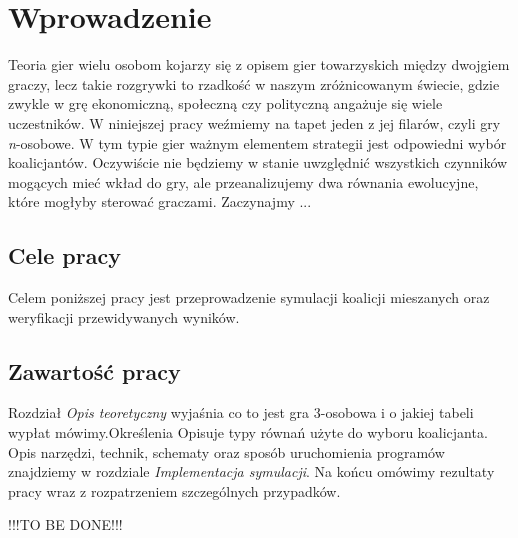 \chapter{Wprowadzenie}
\label{cha:wprowadzenie}

Teoria gier wielu osobom kojarzy się z opisem gier towarzyskich między dwojgiem graczy, lecz takie rozgrywki to rzadkość w naszym zróżnicowanym świecie, gdzie zwykle w grę ekonomiczną, społeczną czy polityczną angażuje się wiele uczestników. 
W niniejszej pracy weźmiemy na tapet jeden z jej filarów, czyli gry \textit{n}-osobowe. W tym typie gier ważnym elementem strategii jest odpowiedni wybór koalicjantów. Oczywiście nie będziemy w stanie uwzględnić wszystkich czynników mogących mieć wkład do gry, ale przeanalizujemy dwa równania ewolucyjne, które mogłyby sterować graczami. Zaczynajmy ...


\section{Cele pracy}
\label{sec:celePracy}

Celem poniższej pracy jest przeprowadzenie symulacji koalicji mieszanych oraz weryfikacji przewidywanych wyników.



\section{Zawartość pracy}
\label{sec:zawartoscPracy}
Rozdział \textit{Opis teoretyczny} wyjaśnia co to jest gra 3-osobowa i o jakiej tabeli wypłat mówimy.Określenia  Opisuje typy równań użyte do wyboru koalicjanta. Opis narzędzi, technik, schematy oraz sposób uruchomienia programów znajdziemy w rozdziale \textit{Implementacja symulacji}. Na końcu omówimy rezultaty pracy wraz z rozpatrzeniem szczególnych przypadków.

!!!TO BE DONE!!! \cite{Now06} \cite{Hof98} \cite{Str01} \cite{Qt} \cite{Tut} \cite{Sza} \cite{Fsmd}
